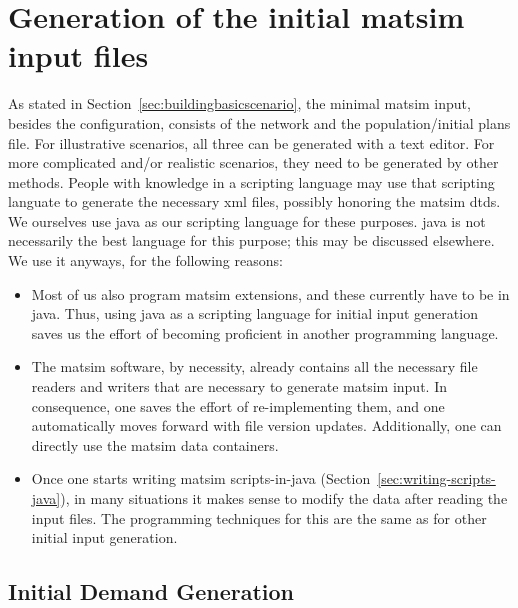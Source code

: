 \section{Generation of the initial \gls{matsim} input files}

As stated in Section~\ref{sec:buildingbasicscenario}, the minimal \gls{matsim} input, besides the configuration, consists of the network and the population/initial plans file.  For illustrative scenarios, all three can be generated with a text editor.  For more complicated and/or realistic scenarios, they need to be generated by other methods.  People with knowledge in a scripting language may use that scripting languate to generate the necessary \gls{xml} files, possibly honoring the \gls{matsim} \glspl{dtd}.  We ourselves use \gls{java} as our scripting language for these purposes.  \gls{java} is not necessarily the best language for this purpose; this may be discussed elsewhere.  We use it anyways, for the following reasons:
\begin{itemize}

\item Most of us also program \gls{matsim} extensions, and these currently have to be in \gls{java}.  Thus, using \gls{java} as a scripting language for initial input generation saves us the effort of becoming proficient in another programming language.

\item The \gls{matsim} software, by necessity, already contains all the necessary file readers and writers that are necessary to generate \gls{matsim} input.  In consequence, one saves the effort of re-implementing them, and one automatically moves forward with file version updates.  Additionally, one can directly use the \gls{matsim} data containers.

\item Once one starts writing \gls{matsim} scripts-in-\gls{java} (Section~\ref{sec:writing-scripts-java}), in many situations it makes sense to modify the data after reading the input files.  The programming techniques for this are the same as for other initial input generation.

\end{itemize}

\subsection{Initial Demand Generation}
\label{sec:extending-initial-demand}

